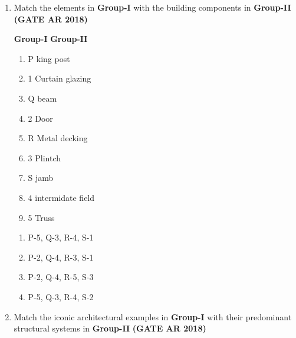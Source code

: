 \documentclass[journal,15pt,onecolumn]{IEEEtran}
\theoremstyle{remark}
\begin{document}
\begin{enumerate}
 

\begin{multicols}{2}
\begin{enumerate}
\item P-5, Q-3, R-1, S-2
\item P-1, Q-5, R-3, S-4
\item P-1, Q-3, R-4, S-5
\end{enumerate}
\end{multicols}
\item 
Match the elements in \textbf{Group-I} with the building components in \textbf{Group-II}\hfill \textbf{ (GATE AR 2018)}

\vspace{0.15cm}

\textbf{Group-I}\hspace{8cm} \textbf{Group-II} 

\begin{enumerate}

\item  P  king post              \item  1 Curtain glazing 
\item  Q  beam                  \item  2  Door 
\item  R   Metal decking        \item 3 Plintch              
\item  S  jamb                  \item 4  intermidate field       
                               \item  5  Truss 
  
\end{enumerate}


\begin{enumerate}

\item    P-5, Q-3, R-4, S-1
\item    P-2, Q-4, R-3, S-1 
\item    P-2, Q-4, R-5, S-3 
\item    P-5, Q-3, R-4, S-2 

\end{enumerate}


\vspace{0.5cm}

\item 
Match the iconic architectural examples in \textbf{Group-I} with their predominant structural systems in \textbf{Group-II}\hfill \textbf{ (GATE AR 2018)}


\end{enumerate}
\end{document}
